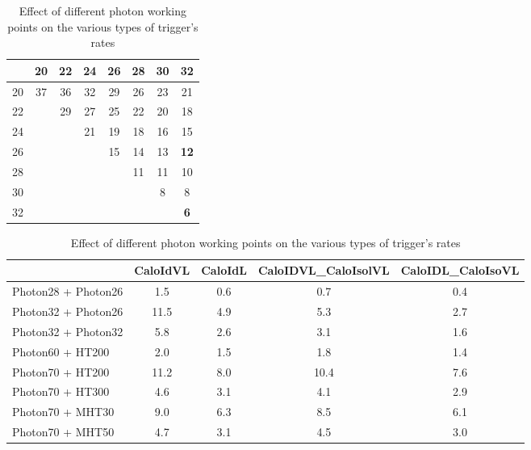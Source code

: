 \begin{table}
\begin{table}
\begin{center}
\begin{tabular}{|l|ccccccc|}\hline
    & 20 & 22 & 24 & 26 & 28 & 30 & 32 \\ \hline \hline
20 & 37 & 36 & 32 & 29 & 26 & 23 & 21 \\
22 &    & 29 & 27 & 25 & 22 & 20 & 18 \\
24 &    &    & 21 & 19 & 18 & 16 & 15 \\
26 &    &    &    & 15 & 14 & 13 & \bf{12} \\
28 &    &    &    &    & 11 & 11 & 10 \\
30 &    &    &    &    &    & 8  & 8  \\
32 &    &    &    &    &    &    & \bf{6}  \\
\end{tabular}
\end{center}
\caption{Diphoton trigger rates at 5e32 with some kind of isolation}
\end{table}



\begin{table}
\begin{center}
\begin{tabular}{|l|cccc|}\hline
                                & CaloIdVL & CaloIdL & CaloIDVL\_CaloIsolVL & CaloIDL\_CaloIsoVL \\ \hline
Photon28 + Photon26             &      1.5              &        0.6              &       0.7          &  0.4 \\
Photon32 + Photon26             &      11.5              &       4.9               &      5.3          &  2.7 \\         
Photon32 + Photon32             &      5.8              &        2.6              &       3.1         &  1.6 \\
Photon60 + HT200                &      2.0              &       1.5               &       1.8         &  1.4 \\
Photon70 + HT200                &      11.2              &       8.0               &      10.4        &  7.6   \\
Photon70 + HT300                &      4.6              &        3.1              &       4.1         & 2.9  \\
Photon70 + MHT30                &      9.0              &       6.3               &      8.5          & 6.1  \\
Photon70 + MHT50                &      4.7              &       3.1               &      4.5          & 3.0  \\ \hline
\end{tabular}
\end{center}
\caption{Effect of different photon working points on the various types of trigger's rates}
\end{table}


\end{table}
